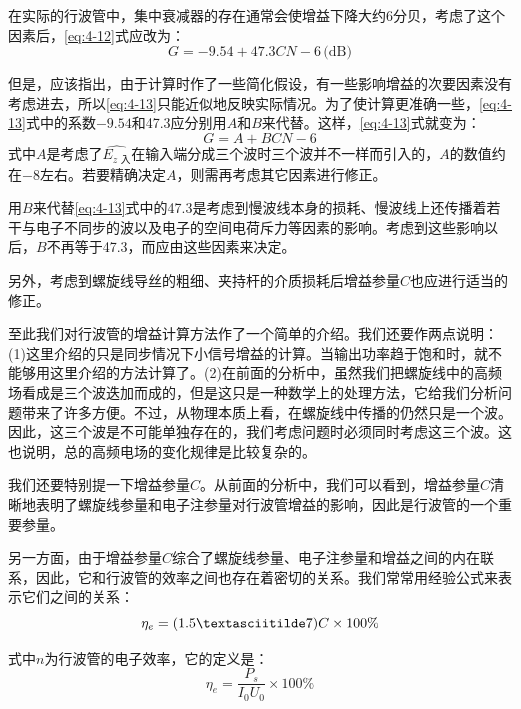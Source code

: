 在实际的行波管中，集中衰减器的存在通常会使增益下降大约6分贝，考虑了这个因素后，\eqref{eq:4-12}式应改为：
\begin{equation} \label{eq:4-13}
	G = -9.54 + 47.3CN -6\, \textrm{(dB)}
\end{equation}

但是，应该指出，由于计算时作了一些简化假设，有一些影响增益的次要因素没有考虑进去，所以\eqref{eq:4-13}只能近似地反映实际情况。为了使计算更准确一些，\eqref{eq:4-13}式中的系数$ -9.54 $和47.3应分别用$ A $和$ B $来代替。这样，\eqref{eq:4-13}式就变为：
\begin{equation} \label{eq:4-14}
	G = A +\mathit{BCN} - 6
\end{equation}
式中$ A $是考虑了$ \hat{E_{z\textrm{ 入}}} $在输入端分成三个波时三个波并不一样而引入的，$ A $的数值约在$ -8 $左右。若要精确决定$ A $，则需再考虑其它因素进行修正。

用$ B $来代替\eqref{eq:4-13}式中的47.3是考虑到慢波线本身的损耗、慢波线上还传播着若干与电子不同步的波以及电子的空间电荷斥力等因素的影响。考虑到这些影响以后，$ B $不再等于47.3，而应由这些因素来决定。

另外，考虑到螺旋线导丝的粗细、夹持杆的介质损耗后增益参量$ C $也应进行适当的修正。

至此我们对行波管的增益计算方法作了一个简单的介绍。我们还要作两点说明：(1)这里介绍的只是同步情况下小信号增益的计算。当输出功率趋于饱和时，就不能够用这里介绍的方法计算了。(2)在前面的分析中，虽然我们把螺旋线中的高频场看成是三个波迭加而成的，但是这只是一种数学上的处理方法，它给我们分析问题带来了许多方便。不过，从物理本质上看，在螺旋线中传播的仍然只是一个波。因此，这三个波是不可能单独存在的，我们考虑问题时必须同时考虑这三个波。这也说明，总的高频电场的变化规律是比较复杂的。

我们还要特别提一下增益参量$ C $。从前面的分析中，我们可以看到，增益参量$ C $清晰地表明了螺旋线参量和电子注参量对行波管增益的影响，因此是行波管的一个重要参量。

另一方面，由于增益参量$ C $综合了螺旋线参量、电子注参量和增益之间的内在联系，因此，它和行波管的效率之间也存在着密切的关系。我们常常用经验公式来表示它们之间的关系：
\begin{equation} \label{eq:4-15}
	\eta_e = (1.5\textasciitilde7)C\times100\%
\end{equation}

式中$ n $为行波管的电子效率，它的定义是：
\begin{equation}\label{eq:4-16}
	\eta_e = \frac{P_s}{I_0U_0}\times 100\%
\end{equation}

